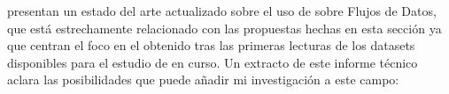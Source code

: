 \ABIERTO
\citet{FMenaHLeonHPalancar-ClasificacionBasadaEnCARFlujosDeDatos-2013} presentan un estado del arte actualizado sobre el uso de \CARs sobre Flujos de Datos, que está estrechamente relacionado con las propuestas hechas en esta sección ya que centran el foco en el \clasificador obtenido tras las primeras lecturas de los datasets disponibles para el estudio de \clasificacion en curso. Un extracto de este informe técnico aclara las posibilidades que puede añadir mi investigación a este campo:



